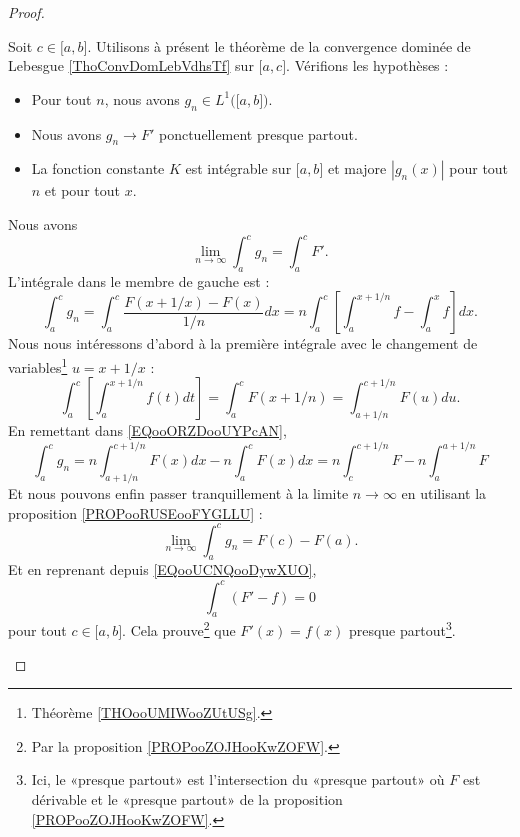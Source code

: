 \begin{proof}
\begin{subproof}
		Soit \( c\in\mathopen[ a,b\mathclose]\). Utilisons à présent le théorème de la convergence dominée de Lebesgue \ref{ThoConvDomLebVdhsTf} sur \( \mathopen[ a,c\mathclose]\). Vérifions les hypothèses :
		\begin{itemize}
			\item
			      Pour tout \( n\), nous avons \( g_n\in L^1\big( \mathopen[ a,b\mathclose] \big)\).
			\item
			      Nous avons \( g_n\to F'\) ponctuellement presque partout.
			\item
			      La fonction constante \( K\) est intégrable sur \(\mathopen[ a,b\mathclose]\) et majore \( | g_n(x) |\) pour tout \( n\) et pour tout \( x\).
		\end{itemize}
		Nous avons
		\begin{equation}		\label{EQooUCNQooDywXUO}
			\lim_{n\to \infty}\int_a^cg_n=\int_a^cF'.
		\end{equation}
		L'intégrale dans le membre de gauche est :
		\begin{equation}		\label{EQooORZDooUYPcAN}
			\int_a^cg_n=\int_a^c\frac{ F(x+1/x)-F(x) }{ 1/n }dx=n\int_a^c\left[  \int_a^{x+1/n}f-\int_a^xf  \right]dx.
		\end{equation}
		Nous nous intéressons d'abord à la première intégrale avec le changement de variables\footnote{Théorème \ref{THOooUMIWooZUtUSg}.} \( u=x+1/x\) :
		\begin{equation}
			\int_a^c\left[ \int_a^{x+1/n}f(t)dt \right]  =\int_a^cF(x+1/n)                                      =\int_{a+1/n}^{c+1/n}F(u)du.
		\end{equation}
		En remettant dans \eqref{EQooORZDooUYPcAN},
		\begin{equation}
			\int_a^cg_n=n\int_{a+1/n}^{c+1/n}F(x)dx-n\int_a^cF(x)dx=n\int_c^{c+1/n}F-n\int_a^{a+1/n}F
		\end{equation}
		Et nous pouvons enfin passer tranquillement à la limite \( n\to \infty\) en utilisant la proposition \ref{PROPooRUSEooFYGLLU} :
		\begin{equation}
			\lim_{n\to \infty}\int_a^cg_n=F(c)-F(a).
		\end{equation}
		Et en reprenant depuis \eqref{EQooUCNQooDywXUO},
		\begin{equation}
			\int_a^c(F'-f)=0
		\end{equation}
		pour tout \( c\in\mathopen[ a,b\mathclose]\). Cela prouve\footnote{Par la proposition \ref{PROPooZOJHooKwZOFW}.} que \( F'(x)=f(x)\) presque partout\footnote{Ici, le «presque partout» est l'intersection du «presque partout» où \( F\) est dérivable et le «presque partout» de la proposition \ref{PROPooZOJHooKwZOFW}.}.


\end{subproof}
\end{proof}
